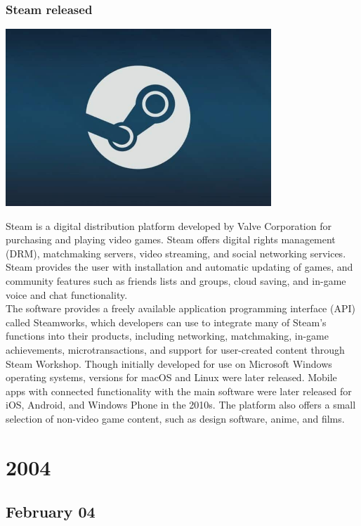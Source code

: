 \documentclass[11pt]{report}
\begin{document}
\subsection{Steam released}
\vspace{2mm}\begin{center}\includegraphics[width=10cm]{./img/steamlogo.jpeg}\end{center}
Steam is a digital distribution platform developed by Valve Corporation for purchasing and playing video games. Steam offers digital rights management (DRM), matchmaking servers, video streaming, and social networking services. Steam provides the user with installation and automatic updating of games, and community features such as friends lists and groups, cloud saving, and in-game voice and chat functionality.\\
The software provides a freely available application programming interface (API) called Steamworks, which developers can use to integrate many of Steam's functions into their products, including networking, matchmaking, in-game achievements, microtransactions, and support for user-created content through Steam Workshop. Though initially developed for use on Microsoft Windows operating systems, versions for macOS and Linux were later released. Mobile apps with connected functionality with the main software were later released for iOS, Android, and Windows Phone in the 2010s. The platform also offers a small selection of non-video game content, such as design software, anime, and films.

\chapter{2004}
\section{February 04}
\end{document}
